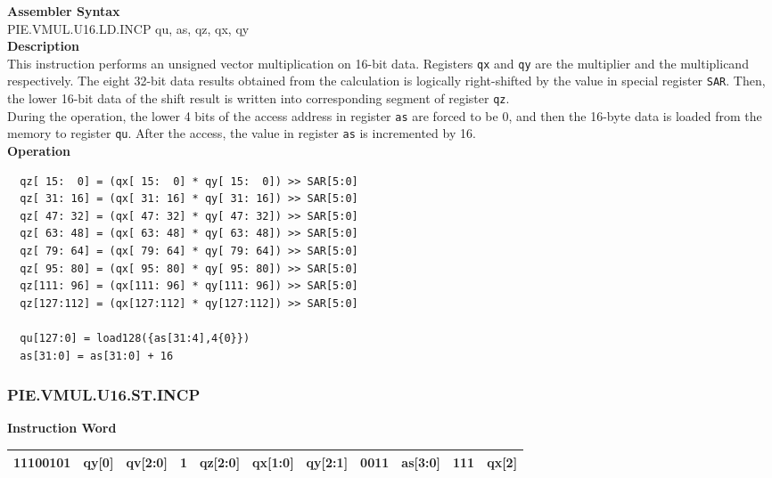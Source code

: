 \textbf{Assembler Syntax} \\
PIE.VMUL.U16.LD.INCP qu, as, qz, qx, qy \\
\textbf{Description} \\
This instruction performs an unsigned vector multiplication on 16-bit data. Registers \lstinline{qx} and \lstinline{qy} are the multiplier and the multiplicand respectively. The eight 32-bit data results obtained from the calculation is logically right-shifted by the value in special register \lstinline{SAR}. Then, the lower 16-bit data of the shift result is written into corresponding segment of register \lstinline{qz}. \\ During the operation, the lower 4 bits of the access address in register \lstinline{as} are forced to be 0, and then the 16-byte data is loaded from the memory to register \lstinline{qu}. After the access, the value in register \lstinline{as} is incremented by 16.\\
\textbf{Operation}
\begin{lstlisting}
  qz[ 15:  0] = (qx[ 15:  0] * qy[ 15:  0]) >> SAR[5:0]
  qz[ 31: 16] = (qx[ 31: 16] * qy[ 31: 16]) >> SAR[5:0]
  qz[ 47: 32] = (qx[ 47: 32] * qy[ 47: 32]) >> SAR[5:0]
  qz[ 63: 48] = (qx[ 63: 48] * qy[ 63: 48]) >> SAR[5:0]
  qz[ 79: 64] = (qx[ 79: 64] * qy[ 79: 64]) >> SAR[5:0]
  qz[ 95: 80] = (qx[ 95: 80] * qy[ 95: 80]) >> SAR[5:0]
  qz[111: 96] = (qx[111: 96] * qy[111: 96]) >> SAR[5:0]
  qz[127:112] = (qx[127:112] * qy[127:112]) >> SAR[5:0]

  qu[127:0] = load128({as[31:4],4{0}})
  as[31:0] = as[31:0] + 16
\end{lstlisting}

\newpage
\subsubsection{PIE.VMUL.U16.ST.INCP}\label{instruction:PIEVMULU16STINCP}
\setlength\tabcolsep{6pt}
\textbf{Instruction Word} \\
\begin{tabular}{|c|c|c|c|c|c|c|c|c|c|c|}
	\hline
	11100101 & qy[0] & qv[2:0] & 1 & qz[2:0] & qx[1:0] & qy[2:1] & 0011 & as[3:0] & 111 & qx[2] \\
	\hline
\end{tabular}

